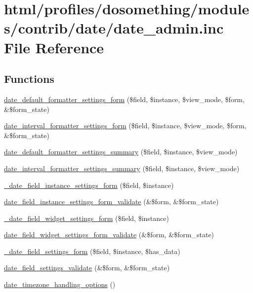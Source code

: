 \hypertarget{date__admin_8inc}{
\section{html/profiles/dosomething/modules/contrib/date/date\_\-admin.inc File Reference}
\label{date__admin_8inc}
}
\subsection*{Functions}
\begin{DoxyCompactItemize}
\item 
\hyperlink{date__admin_8inc_a59e2bd7bef099374be5eb236b835e72b}{date\_\-default\_\-formatter\_\-settings\_\-form} (\$field, \$instance, \$view\_\-mode, \$form, \&\$form\_\-state)
\item 
\hyperlink{date__admin_8inc_a5dee3173cbdd9a679fb2820e328d1bda}{date\_\-interval\_\-formatter\_\-settings\_\-form} (\$field, \$instance, \$view\_\-mode, \$form, \&\$form\_\-state)
\item 
\hyperlink{date__admin_8inc_a03cbbb0167b3eb6f56bf5834af6d5241}{date\_\-default\_\-formatter\_\-settings\_\-summary} (\$field, \$instance, \$view\_\-mode)
\item 
\hyperlink{date__admin_8inc_afa08535c924eb68cc497eb5e770026e5}{date\_\-interval\_\-formatter\_\-settings\_\-summary} (\$field, \$instance, \$view\_\-mode)
\item 
\hyperlink{date__admin_8inc_a2492af6b02e01e06c8efea31650b1bc2}{\_\-date\_\-field\_\-instance\_\-settings\_\-form} (\$field, \$instance)
\item 
\hyperlink{date__admin_8inc_a4a30fe673c9a4249ac93668b8c9e7bdc}{date\_\-field\_\-instance\_\-settings\_\-form\_\-validate} (\&\$form, \&\$form\_\-state)
\item 
\hyperlink{date__admin_8inc_a794106e9989d98e7ed83b325186a7f1c}{\_\-date\_\-field\_\-widget\_\-settings\_\-form} (\$field, \$instance)
\item 
\hyperlink{date__admin_8inc_a20ea5e4f157140ba68146345059d7a36}{date\_\-field\_\-widget\_\-settings\_\-form\_\-validate} (\&\$form, \&\$form\_\-state)
\item 
\hyperlink{date__admin_8inc_a093c2cd636fa311d4a0bf44d398f822f}{\_\-date\_\-field\_\-settings\_\-form} (\$field, \$instance, \$has\_\-data)
\item 
\hyperlink{date__admin_8inc_a6a824eba39c878d75f07f6ae4d585b36}{date\_\-field\_\-settings\_\-validate} (\&\$form, \&\$form\_\-state)
\item 
\hyperlink{date__admin_8inc_a25691fb6b96ef1555014c00568485635}{date\_\-timezone\_\-handling\_\-options} ()
\end{DoxyCompactItemize}


